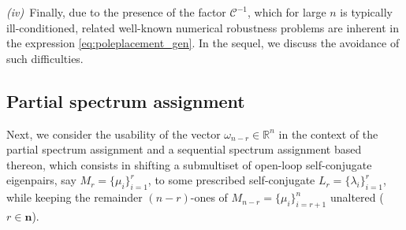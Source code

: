 \documentclass[conference]{IEEEtran}
\newcommand{\numn}{\boldsymbol{n}}
\newcommand{\om}{\omega}
\begin{document}
\emph{(iv)}~Finally, due to the presence of the factor
$\mathcal{C}^{-1}$, which for large $n$ is typically ill-conditioned,
related well-known numerical robustness problems are inherent in the
expression \eqref{eq:poleplacement_gen}. In the sequel, we discuss the
avoidance of such difficulties. 











\subsection{Partial spectrum assignment}
\label{Partial pole placement}
Next, we consider the usability of the vector $\om_{n-r}\in\mathbb{R}^n$ in the context of the partial spectrum assignment and a sequential spectrum assignment based thereon, which consists in shifting a submultiset of open-loop self-conjugate eigenpairs, say $M_{r}=\{\mu_i\}_{i=1}^{r}$, to some prescribed self-conjugate $L_{r}=\{\lambda_i\}_{i=1}^{r}$, while keeping the remainder $(n-r)$-ones of $M_{n-r}=\{\mu_i\}_{i=r+1}^n$ unaltered ($r\in\numn$). 
\end{document}
